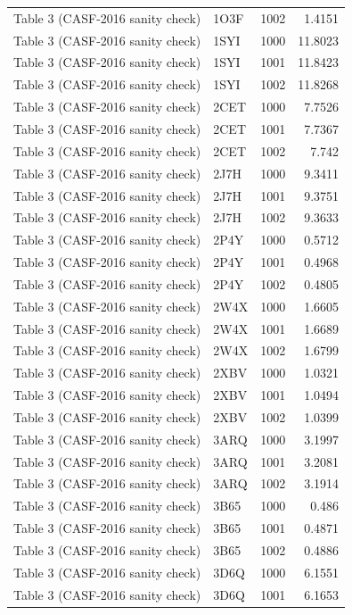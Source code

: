 \begin{longtable}{llrr}
Table 3 (CASF-2016 sanity check) & 1O3F & 1002 & 1.4151 \\
Table 3 (CASF-2016 sanity check) & 1SYI & 1000 & 11.8023 \\
Table 3 (CASF-2016 sanity check) & 1SYI & 1001 & 11.8423 \\
Table 3 (CASF-2016 sanity check) & 1SYI & 1002 & 11.8268 \\
Table 3 (CASF-2016 sanity check) & 2CET & 1000 & 7.7526 \\
Table 3 (CASF-2016 sanity check) & 2CET & 1001 & 7.7367 \\
Table 3 (CASF-2016 sanity check) & 2CET & 1002 & 7.742 \\
Table 3 (CASF-2016 sanity check) & 2J7H & 1000 & 9.3411 \\
Table 3 (CASF-2016 sanity check) & 2J7H & 1001 & 9.3751 \\
Table 3 (CASF-2016 sanity check) & 2J7H & 1002 & 9.3633 \\
Table 3 (CASF-2016 sanity check) & 2P4Y & 1000 & 0.5712 \\
Table 3 (CASF-2016 sanity check) & 2P4Y & 1001 & 0.4968 \\
Table 3 (CASF-2016 sanity check) & 2P4Y & 1002 & 0.4805 \\
Table 3 (CASF-2016 sanity check) & 2W4X & 1000 & 1.6605 \\
Table 3 (CASF-2016 sanity check) & 2W4X & 1001 & 1.6689 \\
Table 3 (CASF-2016 sanity check) & 2W4X & 1002 & 1.6799 \\
Table 3 (CASF-2016 sanity check) & 2XBV & 1000 & 1.0321 \\
Table 3 (CASF-2016 sanity check) & 2XBV & 1001 & 1.0494 \\
Table 3 (CASF-2016 sanity check) & 2XBV & 1002 & 1.0399 \\
Table 3 (CASF-2016 sanity check) & 3ARQ & 1000 & 3.1997 \\
Table 3 (CASF-2016 sanity check) & 3ARQ & 1001 & 3.2081 \\
Table 3 (CASF-2016 sanity check) & 3ARQ & 1002 & 3.1914 \\
Table 3 (CASF-2016 sanity check) & 3B65 & 1000 & 0.486 \\
Table 3 (CASF-2016 sanity check) & 3B65 & 1001 & 0.4871 \\
Table 3 (CASF-2016 sanity check) & 3B65 & 1002 & 0.4886 \\
Table 3 (CASF-2016 sanity check) & 3D6Q & 1000 & 6.1551 \\
Table 3 (CASF-2016 sanity check) & 3D6Q & 1001 & 6.1653 \\

\end{longtable}
